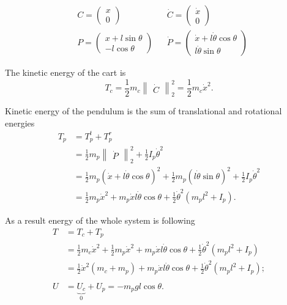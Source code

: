 \documentclass[12pt]{article}
\newcommand{\pmat}[1]{\begin{pmatrix}#1\end{pmatrix}}
\begin{document}
\begin{align}
    & C = \pmat{x                 \\ 0}  & &\dot{C} = \pmat{\dot{x} \\ 0} \nonumber \\
    & P = \pmat{x + l \sin \theta \\ - l \cos \theta} & &\dot{P} = \pmat{\dot{x} + l \dot{\theta} \cos \theta \\ l \dot{\theta} \sin \theta}
\end{align}

The kinetic energy of the cart is
\begin{equation}
    T_c = \frac{1}{2} m_c \begin{Vmatrix}
        \dot{C}
    \end{Vmatrix}_2^2 = \frac{1}{2} m_c \dot{x}^2.
\end{equation}


Kinetic energy of the pendulum is the sum of translational and rotational energies
\begin{align}
    T_p & = T^t_p + T^r_p \nonumber \\
        & = \frac{1}{2} m_p \begin{Vmatrix}\dot{P}\end{Vmatrix}_2^2 + \frac{1}{2}I_p\dot{\theta}^2 \nonumber \\
        & = \frac{1}{2} m_p (\dot{x} + l \dot{\theta} \cos \theta )^2 + \frac{1}{2} m_p (l \dot{\theta} \sin \theta)^2 + \frac{1}{2}I_p\dot{\theta}^2 \nonumber \\
        & = \frac{1}{2} m_p \dot{x}^2 + m_p \dot{x} l \dot{\theta} \cos \theta + \frac{1}{2} \dot{\theta}^2 \left( m_p l^2  + I_p \right).
\end{align}

As a result energy of the whole system is following
\begin{align}
    T & = T_c + T_p \nonumber \\
      & = \frac{1}{2} m_c \dot{x}^2 + \frac{1}{2} m_p \dot{x}^2 + m_p \dot{x} l \dot{\theta} \cos \theta + \frac{1}{2} \dot{\theta}^2 \left( m_p l^2  + I_p \right) \nonumber \\
      & = \frac{1}{2} \dot{x}^2 (m_c + m_p) + m_p \dot{x} l \dot{\theta} \cos \theta + \frac{1}{2} \dot{\theta}^2 \left( m_p l^2  + I_p \right); \\
      & \nonumber \\
    U & = \underbrace{U_c}_{0} + U_p = -m_p gl \cos \theta.
\end{align}
\end{document}
